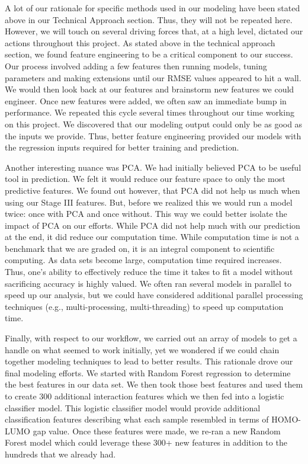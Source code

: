 \documentclass[11pt, oneside]{article}   	%
\begin{document}
A lot of our rationale for specific methods used in our modeling have been stated above in our Technical Approach section. Thus, they will not be repeated here. However, we will touch on several driving forces that, at a high level, dictated our actions throughout this project. As stated above in the technical approach section, we found feature engineering to be a critical component to our success. Our process involved adding a few features then running models, tuning parameters and making extensions until our RMSE values appeared to hit a wall. We would then look back at our features and brainstorm new features we could engineer. Once new features were added, we often saw an immediate bump in performance. We repeated this cycle several times throughout our time working on this project. We discovered that our modeling output could only be as good as the inputs we provide. Thus, better feature engineering provided our models with the regression inputs required for better training and prediction. 

Another interesting nuance was PCA. We had initially believed PCA to be useful tool in prediction. We felt it would reduce our feature space to only the most predictive features. We found out however, that PCA did not help us much when using our Stage III features. But, before we realized this we would run a model twice: once with PCA and once without. This way we could better isolate the impact of PCA on our efforts. While PCA did not help much with our prediction at the end, it did reduce our computation time. While computation time is not a benchmark that we are graded on, it is an integral component to scientific computing. As data sets become large, computation time required increases. Thus, one's ability to effectively reduce the time it takes to fit a model without sacrificing accuracy is highly valued. We often ran several models in parallel to speed up our analysis, but we could have considered additional parallel processing techniques (e.g., multi-processing, multi-threading) to speed up computation time.

Finally, with respect to our workflow, we carried out an array of models to get a handle on what seemed to work initially, yet we wondered if we could chain together modeling techniques to lead to better results. This rationale drove our final modeling efforts. We started with Random Forest regression to determine the best features in our data set. We then took those best features and used them to create 300 additional interaction features which we then fed into a logistic classifier model. This logistic classifier model would provide additional classification features describing what each sample resembled in terms of HOMO-LUMO gap value. Once these features were made, we re-ran a new Random Forest model which could leverage these 300+ new features in addition to the hundreds that we already had. 
\end{document}
